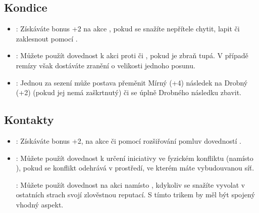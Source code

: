 \subsection{Kondice}
\label{sec:trik-kondice}

\begin{itemize}
\item{}:
\label{sec:kondice-zapas}
Získáváte bonus +2 na akce , pokud se snažíte nepřítele chytit, lapit či zaklesnout pomocí .

\item{}:
\label{sec:kondice-drsnak}
Můžete použít dovednost  k akci  proti  či , pokud je zbraň tupá. V případě remízy však dostáváte zranění o velikosti jednoho posunu.

\item{}:
\label{sec:kondice-nezdolny}
Jednou za sezení může postava přeměnit Mírný (+4) následek na Drobný (+2) (pokud jej nemá zaškrtnutý) či se úplně Drobného následku zbavit.
\end{itemize}

\subsection{Kontakty}
\label{sec:trik-kontakty}

\begin{itemize}
\item{}:
\label{sec:kontakty-drbna}
Získáváte bonus +2, na akce  či  pomocí rozšiřování pomluv dovedností .

\item{}:
\label{sec:kontakty-ucho}
Můžete použít dovednost  k určení iniciativy ve fyzickém konfliktu (namísto ), pokud se konflikt odehrává v prostředí, ve kterém máte vybudouvanou síť.

:
\label{sec:kontakty-reputace}
Můžete použít dovednost  na akci  namísto , kdykoliv se snažíte vyvolat v ostatních strach svojí zlověstnou reputací. S tímto trikem by měl být spojený vhodný aspekt.
\end{itemize}

